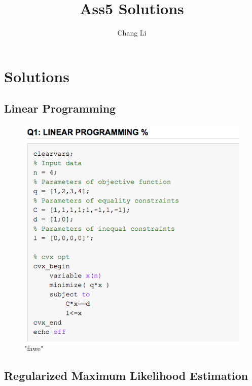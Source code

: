 \documentclass[10pt,a4paper]{article}
\begin{document}
\title{Ass5 Solutions}
\author{Chang Li}
\maketitle

\section{Solutions}

\subsection{Linear Programming}

\begin{figure}
	\centering
	\includegraphics[width=0.7\linewidth]{images/Q1_code.png}
	\caption{"fawe"}
	\label{fig:code:Q1}
\end{figure}


\subsection{Regularized Maximum Likelihood Estimation}
\end{document}

